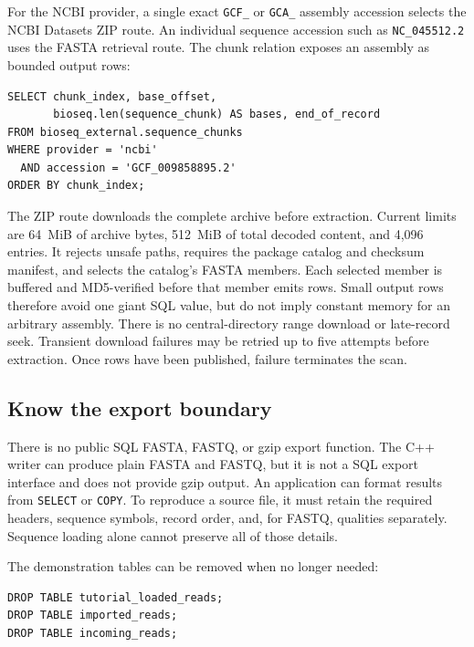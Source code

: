 For the NCBI provider, a single exact \texttt{GCF\_} or \texttt{GCA\_}
assembly accession selects the NCBI Datasets ZIP route. An individual
sequence accession such as \texttt{NC\_045512.2} uses the FASTA retrieval
route. The chunk relation exposes an assembly as bounded output rows:
\par\noindent\begin{minipage}{\linewidth}
\begin{lstlisting}[style=bioseq-appendix-sql]
SELECT chunk_index, base_offset,
       bioseq.len(sequence_chunk) AS bases, end_of_record
FROM bioseq_external.sequence_chunks
WHERE provider = 'ncbi'
  AND accession = 'GCF_009858895.2'
ORDER BY chunk_index;
\end{lstlisting}
\end{minipage}

The ZIP route downloads the complete archive before extraction. Current
limits are 64~MiB of archive bytes, 512~MiB of total decoded content, and
4,096 entries. It rejects unsafe paths, requires the package catalog and
checksum manifest, and selects the catalog's FASTA members. Each selected
member is buffered and MD5-verified before that member emits rows.
Small output rows therefore
avoid one giant SQL value, but do not imply constant memory for an arbitrary
assembly. There is no central-directory range download or late-record seek.
Transient download failures may be retried up to five attempts before
extraction. Once rows have been published, failure terminates the scan.

\subsection{Know the export boundary}

There is no public SQL FASTA, FASTQ, or gzip export function. The C++ writer
can produce plain FASTA and FASTQ, but it is not a SQL export interface and
does not provide gzip output. An application can format results from
\texttt{SELECT} or \texttt{COPY}. To reproduce a source file, it must retain
the required headers, sequence symbols, record order, and, for FASTQ,
qualities separately. Sequence loading alone cannot preserve all of those
details.

The demonstration tables can be removed when no longer needed:
\par\noindent\begin{minipage}{\linewidth}
\begin{lstlisting}[style=bioseq-appendix-sql]
DROP TABLE tutorial_loaded_reads;
DROP TABLE imported_reads;
DROP TABLE incoming_reads;
\end{lstlisting}
\end{minipage}

